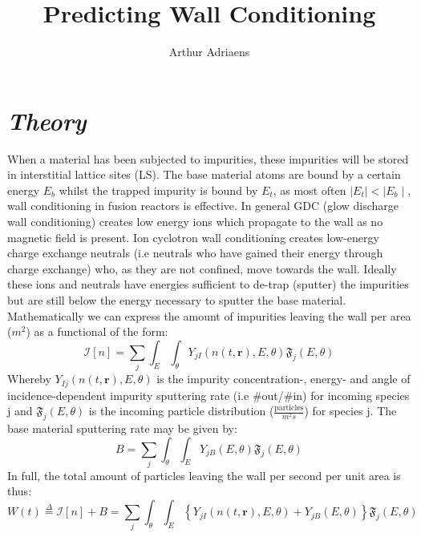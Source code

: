 \documentclass{article}
\title{Predicting Wall Conditioning}
\author{Arthur Adriaens}
\begin{document}
\maketitle
\section*{\textit{Theory}}
When a material has been subjected to impurities, these impurities will be
stored in interstitial lattice sites  (LS). The base material atoms are bound
by a certain energy $E_b$ whilst the trapped impurity is bound by $E_t$, as
most often $\mid E_t\mid <\mid E_b\mid $, wall conditioning in fusion reactors is effective.  
In general GDC (glow discharge wall conditioning) creates low energy ions
which propagate to the wall as no magnetic field is present. Ion cyclotron 
wall conditioning creates low-energy charge exchange neutrals (i.e
neutrals who have gained their energy through charge exchange) who, as they are
not confined, move towards the wall. Ideally these ions and neutrals have energies
sufficient to de-trap (sputter) the impurities but are still below the energy
necessary to sputter the base material.  Mathematically we can express the
amount of impurities leaving the wall per area ($m^2$) as a functional of the form:
\begin{equation}
    \mathcal{I}[n] = \sum_j\int_E \int_\theta Y_{jI}(n(t,\mathbf{r}),E,\theta)\mathfrak{F}_j(E,\theta)
\end{equation}
Whereby $Y_{Ij}(n(t,\mathbf{r}),E,\theta)$ is the impurity concentration-, energy- and
angle of incidence-dependent impurity sputtering rate (i.e \#out/\#in) for
incoming species j and $\mathfrak{F}_j(E,\theta)$ is the incoming particle
distribution ($\frac{\text{particles}}{m^2s}$) for species j.  The base
material sputtering rate may be given by:
\begin{equation}
    B = \sum_j\int_\theta \int_E Y_{jB}(E,\theta)\mathfrak{F}_j(E,\theta)
\end{equation}
In full, the total amount of particles leaving the wall per second per unit area
is thus:
\begin{equation}
    W(t) \stackrel{\Delta}{=} \mathcal{I}[n] + B = \sum_j \int_\theta \int_E \left\{ Y_{jI}(n(t,\mathbf{r}),E,\theta) + Y_{jB}(E,\theta) \right\} \mathfrak{F}_j(E,\theta)
\end{equation}
\newpage
\end{document}
